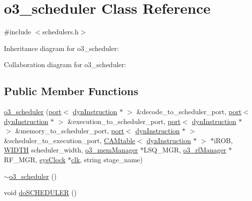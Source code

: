 \hypertarget{classo3__scheduler}{
\section{o3\_\-scheduler Class Reference}
\label{classo3__scheduler}
}


{\ttfamily \#include $<$schedulers.h$>$}



Inheritance diagram for o3\_\-scheduler:


Collaboration diagram for o3\_\-scheduler:
\subsection*{Public Member Functions}
\begin{DoxyCompactItemize}
\item 
\hyperlink{classo3__scheduler_adc3f3ae0730ab28d14f0b3cadcbd6830}{o3\_\-scheduler} (\hyperlink{classport}{port}$<$ \hyperlink{classdynInstruction}{dynInstruction} $\ast$ $>$ \&decode\_\-to\_\-scheduler\_\-port, \hyperlink{classport}{port}$<$ \hyperlink{classdynInstruction}{dynInstruction} $\ast$ $>$ \&execution\_\-to\_\-scheduler\_\-port, \hyperlink{classport}{port}$<$ \hyperlink{classdynInstruction}{dynInstruction} $\ast$ $>$ \&memory\_\-to\_\-scheduler\_\-port, \hyperlink{classport}{port}$<$ \hyperlink{classdynInstruction}{dynInstruction} $\ast$ $>$ \&scheduler\_\-to\_\-execution\_\-port, \hyperlink{classCAMtable}{CAMtable}$<$ \hyperlink{classdynInstruction}{dynInstruction} $\ast$ $>$ $\ast$iROB, \hyperlink{global_2global_8h_a6fa2e24b8a418fa215e183264cbea3aa}{WIDTH} scheduler\_\-width, \hyperlink{classo3__memManager}{o3\_\-memManager} $\ast$LSQ\_\-MGR, \hyperlink{classo3__rfManager}{o3\_\-rfManager} $\ast$RF\_\-MGR, \hyperlink{classsysClock}{sysClock} $\ast$\hyperlink{g__objs_8h_afc4784c140eed1743728e83840e91c12}{clk}, string stage\_\-name)
\item 
\hyperlink{classo3__scheduler_ad9624ab36caacb50f844098a32b1fa94}{$\sim$o3\_\-scheduler} ()
\item 
void \hyperlink{classo3__scheduler_a37acf664732fcc9b2a346a12fc26f7be}{doSCHEDULER} ()
\end{DoxyCompactItemize}



